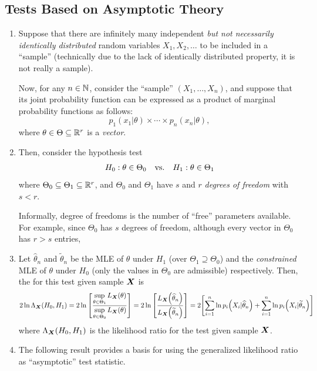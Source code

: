 \subsection{Tests Based on Asymptotic Theory}
\begin{enumerate}
\item Suppose that there are infinitely many independent \emph{but not
necessarily identically distributed} random variables \(X_1,X_2,\dotsc\) to be
included in a ``sample'' (technically due to the lack of identically
distributed property, it is not really a sample).

Now, for any \(n\in\mathbb{N}\), consider the ``sample'' \((X_1,\dotsc,X_n)\), and
suppose that its joint probability function can be expressed as a product of
marginal probability functions as follows:
\[
p_1(x_1|\theta)\times\dotsb\times p_n(x_n|\theta),
\]
where \(\theta\in\Theta\subseteq\mathbb{R}^r\) is a \emph{vector}.
\item Then, consider the hypothesis test
\[
H_0:\theta\in\Theta_0\qqtext{vs.}H_1:\theta\in\Theta_1
\]
where \(\Theta_0\subseteq\Theta_1\subseteq\mathbb{R}^r\), and \(\Theta_0\) and \(\Theta_1\)
have \(s\) and \(r\) \emph{degrees of freedom} with \(s<r\).

\begin{note}
Informally, degree of freedoms is the number of ``free'' parameters available.
For example, since \(\Theta_0\) has \(s\) degrees of freedom, although every
vector in \(\Theta_0\) has \(r>s\) entries, 
\end{note}

\item Let \(\widehat{\theta}_n\) and \(\widetilde{\theta}_n\) be the MLE of
\(\theta\) under \(H_1\) (over \(\Theta_1\supseteq\Theta_0\)) and the \emph{constrained} MLE of
\(\theta\) under \(H_0\) (only the values in \(\Theta_0\) are admissible)
respectively. Then, the  for this test given
sample \(\vb*{X}\) is
\[
2\ln\Lambda_{\vb*{X}}(H_0, H_1)=
2\ln\qty[\frac{\displaystyle \sup_{\theta\in\Theta_1}L_{\vb*{X}}\qty(\theta)}
{\displaystyle \sup_{\theta\in\Theta_0}L_{\vb*{X}}\qty(\theta)}]
=2\ln\qty[\frac{L_{\vb*{X}}\qty(\widehat{\theta}_n)}{L_{\vb*{X}}\qty(\widetilde{\theta}_n)}]
=2\qty[\sum_{i=1}^{n}\ln p_i\qty(X_i|\widehat{\theta}_n)
+\sum_{i=1}^{n}\ln p_i\qty(X_i|\widetilde{\theta}_n)]
\]
where \(\Lambda_{\vb*{X}}(H_0, H_1)\) is the likelihood ratio for the test
given sample \(\vb*{X}\).

\item The following result provides a basis for using the generalized
likelihood ratio as ``asymptotic'' test statistic.


\end{enumerate}
